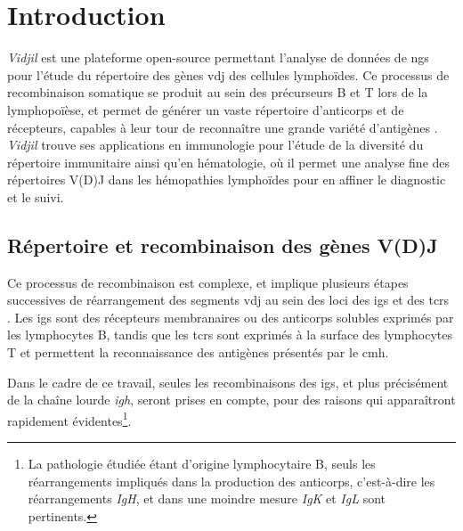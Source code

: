 
\chapter{Introduction}

\textit{Vidjil} est une plateforme open-source
\cite{giraudFastMulticlonalClusterization2014b} permettant l'analyse de données
de \gls{ngs} pour l'étude du répertoire des gènes \gls{vdj} des cellules
lymphoïdes. Ce processus de recombinaison somatique se produit au sein des
précurseurs B et T lors de la lymphopoïèse, et permet de générer un vaste
répertoire d'anticorps et de récepteurs, capables à leur tour de reconnaître une
grande variété d'antigènes \cite{jonesTamingTransposonVDJ2004}. \textit{Vidjil}
trouve ses applications en immunologie pour l'étude de la diversité du
répertoire immunitaire ainsi qu'en hématologie, où il permet une analyse fine
des répertoires V(D)J dans les hémopathies lymphoïdes pour en affiner le
diagnostic et le suivi.

\section{Répertoire et recombinaison des gènes V(D)J}


Ce processus de recombinaison est complexe, et implique plusieurs étapes
successives de réarrangement des segments \gls{vdj} au sein des loci des
\glspl{ig} et des \glspl{tcr} \cite{rothVDJRecombinationMechanism2014}. Les
\glspl{ig} sont des récepteurs membranaires ou des anticorps solubles exprimés
par les lymphocytes B, tandis que les \glspl{tcr} sont exprimés à la surface
des lymphocytes T et permettent la reconnaissance des antigènes présentés par
le \gls{cmh}.

\vspace{1em}

Dans le cadre de ce travail, seules les recombinaisons des \glspl{ig}, et plus
précisément de la chaîne lourde \textit{\gls{igh}}, seront prises en compte,
pour des raisons qui apparaîtront rapidement évidentes\footnote{La pathologie
étudiée étant d'origine lymphocytaire B, seuls les réarrangements impliqués
dans la production des anticorps, c'est-à-dire les réarrangements \textit{IgH},
et dans une moindre mesure \textit{IgK} et \textit{IgL} sont pertinents.}.

